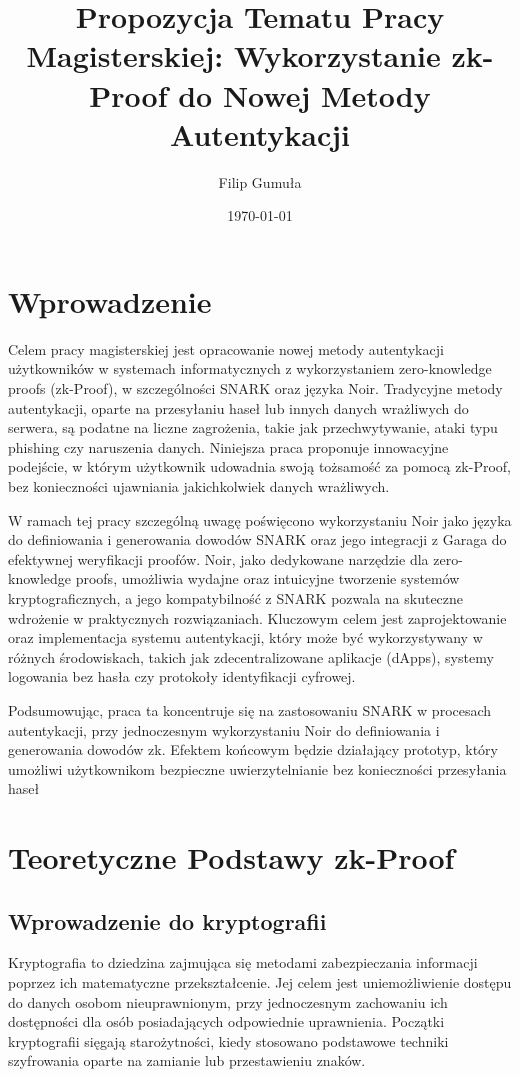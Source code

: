 \documentclass{article}
\title{Propozycja Tematu Pracy Magisterskiej: Wykorzystanie zk-Proof do Nowej Metody Autentykacji}
\author{Filip Gumuła}
\date{\today}
\begin{document}
\maketitle

\section{Wprowadzenie}
Celem pracy magisterskiej jest opracowanie nowej metody autentykacji użytkowników w systemach informatycznych z wykorzystaniem zero-knowledge proofs (zk-Proof), 
w szczególności SNARK oraz języka Noir. Tradycyjne metody autentykacji, oparte na przesyłaniu haseł lub innych danych wrażliwych do serwera, są podatne na liczne zagrożenia, 
takie jak przechwytywanie, ataki typu phishing czy naruszenia danych. Niniejsza praca proponuje innowacyjne podejście, 
w którym użytkownik udowadnia swoją tożsamość za pomocą zk-Proof, bez konieczności ujawniania jakichkolwiek danych wrażliwych.

W ramach tej pracy szczególną uwagę poświęcono wykorzystaniu Noir jako języka do definiowania i generowania dowodów SNARK oraz jego integracji z 
Garaga do efektywnej weryfikacji proofów. Noir, jako dedykowane narzędzie dla zero-knowledge proofs, 
umożliwia wydajne oraz intuicyjne tworzenie systemów kryptograficznych, a jego kompatybilność z SNARK 
pozwala na skuteczne wdrożenie w praktycznych rozwiązaniach. Kluczowym celem jest zaprojektowanie oraz implementacja systemu autentykacji, 
który może być wykorzystywany w różnych środowiskach, takich jak zdecentralizowane aplikacje (dApps), systemy logowania bez hasła czy protokoły identyfikacji cyfrowej.

Podsumowując, praca ta koncentruje się na zastosowaniu SNARK w procesach autentykacji, przy jednoczesnym wykorzystaniu Noir do definiowania i generowania dowodów zk. 
Efektem końcowym będzie działający prototyp, który umożliwi użytkownikom bezpieczne uwierzytelnianie bez konieczności przesyłania haseł


\section{Teoretyczne Podstawy zk-Proof}

\subsection{Wprowadzenie do kryptografii}
Kryptografia to dziedzina zajmująca się metodami zabezpieczania informacji poprzez ich matematyczne przekształcenie. 
Jej celem jest uniemożliwienie dostępu do danych osobom nieuprawnionym, przy jednoczesnym zachowaniu ich dostępności dla osób posiadających odpowiednie uprawnienia. 
Początki kryptografii sięgają starożytności, kiedy stosowano podstawowe techniki szyfrowania oparte na zamianie lub przestawieniu znaków.
\end{document}
